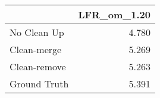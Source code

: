 \begin{tabular}{lr}
\toprule
{} & LFR_om_1.20 \\
\midrule
No Clean Up  &       4.780 \\
Clean-merge  &       5.269 \\
Clean-remove &       5.263 \\
Ground Truth &       5.391 \\
\bottomrule
\end{tabular}
